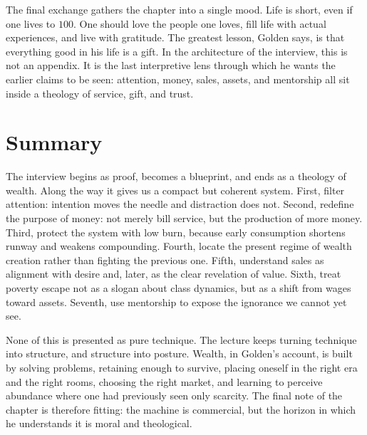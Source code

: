 The final exchange gathers the chapter into a single mood. Life is short, even if one lives to \(100\). One should love the people one loves, fill life with actual experiences, and live with gratitude. The greatest lesson, Golden says, is that everything good in his life is a gift. In the architecture of the interview, this is not an appendix. It is the last interpretive lens through which he wants the earlier claims to be seen: attention, money, sales, assets, and mentorship all sit inside a theology of service, gift, and trust.

\section{Summary}

The interview begins as proof, becomes a blueprint, and ends as a theology of wealth. Along the way it gives us a compact but coherent system. First, filter attention: intention moves the needle and distraction does not. Second, redefine the purpose of money: not merely bill service, but the production of more money. Third, protect the system with low burn, because early consumption shortens runway and weakens compounding. Fourth, locate the present regime of wealth creation rather than fighting the previous one. Fifth, understand sales as alignment with desire and, later, as the clear revelation of value. Sixth, treat poverty escape not as a slogan about class dynamics, but as a shift from wages toward assets. Seventh, use mentorship to expose the ignorance we cannot yet see.

None of this is presented as pure technique. The lecture keeps turning technique into structure, and structure into posture. Wealth, in Golden's account, is built by solving problems, retaining enough to survive, placing oneself in the right era and the right rooms, choosing the right market, and learning to perceive abundance where one had previously seen only scarcity. The final note of the chapter is therefore fitting: the machine is commercial, but the horizon in which he understands it is moral and theological.